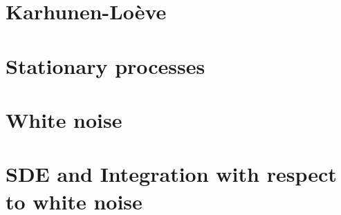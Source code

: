 \section{Karhunen-Lo\`eve}

\section{Stationary processes}

\section{White noise}

\section{SDE and Integration with respect to white noise}
